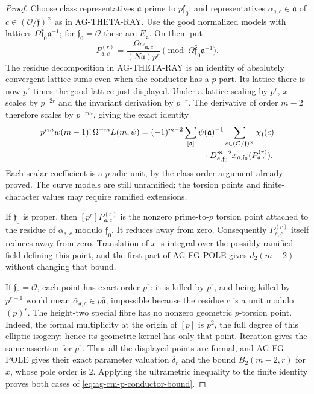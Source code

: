 \documentclass[11pt,a4paper]{article}
\begin{document}
\begin{proof}
Choose class representatives $\mathfrak a$ prime to
$p\mathfrak f_0$, and representatives
$\alpha_{\mathfrak a,c}\in\mathfrak a$ of
$c\in(\mathcal O/\mathfrak f)^\times$ as in AG-THETA-RAY.
Use the good normalized models with lattices
$\Omega\bar{\mathfrak f}_0\mathfrak a^{-1}$; for
$\mathfrak f_0=\mathcal O$ these are $E_{\mathfrak a}$.
On them put
\[
 P^{(r)}_{\mathfrak a,c}
   =\frac{\Omega\bar\alpha_{\mathfrak a,c}}
                    {(N\mathfrak a)p^r}
       \pmod{\Omega\bar{\mathfrak f}_0\mathfrak a^{-1}}.
\]
The residue decomposition in AG-THETA-RAY is an identity of
absolutely convergent lattice sums even when the conductor has
a $p$-part. Its lattice there is now $p^r$ times the good
lattice just displayed. Under a lattice scaling by $p^r$,
$x$ scales by $p^{-2r}$ and the invariant derivation by
$p^{-r}$. The derivative of order $m-2$ therefore scales by
$p^{-rm}$, giving the exact identity
\[
 \begin{aligned}
 p^{rm}w(m-1)!\,\Omega^{-m}L(m,\psi)
 ={}&(-1)^{m-2}\sum_{[\mathfrak a]}\psi(\mathfrak a)^{-1}
    \sum_{c\in(\mathcal O/\mathfrak f)^\times}
       \chi_{\mathfrak f}(c)\\[-2pt]
 &\hspace{22mm}\cdot
       D_{\mathfrak a,\mathfrak f_0}^{m-2}
          x_{\mathfrak a,\mathfrak f_0}
                (P^{(r)}_{\mathfrak a,c}).
 \end{aligned}
\]
Each scalar coefficient is a $p$-adic unit, by the class-order
argument already proved. The curve models are still unramified;
the torsion points and finite-character values may require
ramified extensions.

If $\mathfrak f_0$ is proper, then
$[p^r]P^{(r)}_{\mathfrak a,c}$ is the nonzero prime-to-$p$
torsion point attached to the residue of
$\alpha_{\mathfrak a,c}$ modulo $\mathfrak f_0$.
It reduces away from zero. Consequently
$P^{(r)}_{\mathfrak a,c}$ itself reduces away from zero.
Translation of $x$ is integral over the possibly ramified
field defining this point, and the first part of AG-FG-POLE
gives $d_2(m-2)$ without changing that bound.

If $\mathfrak f_0=\mathcal O$, each point has exact order
$p^r$: it is killed by $p^r$, and being killed by $p^{r-1}$
would mean $\bar\alpha_{\mathfrak a,c}\in p\bar{\mathfrak a}$,
impossible because the residue $c$ is a unit modulo $(p)^r$.
The height-two special fibre has no nonzero geometric
$p$-torsion point. Indeed, the formal multiplicity at the
origin of $[p]$ is $p^2$, the full degree of this elliptic
isogeny; hence its geometric kernel has only that point.
Iteration gives the same assertion for $p^r$.
Thus all the displayed points are formal, and AG-FG-POLE gives
their exact parameter valuation $\delta_r$ and the bound
$B_2(m-2,r)$ for $x$, whose pole order is $2$.
Applying the ultrametric inequality to the finite identity
proves both cases of \eqref{eq:ag-cm-p-conductor-bound}.
\end{proof}
\end{document}
